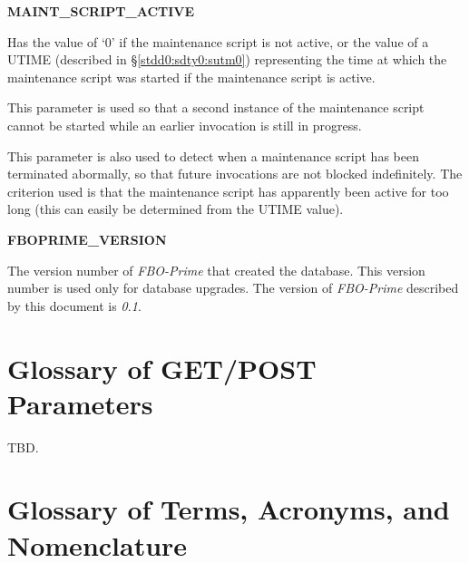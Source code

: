 \documentclass[letterpaper,10pt,titlepage]{article}
\newcommand{\productbasename}{FBO-Prime}
\newcommand{\productversion}{0.1}
\newenvironment{docglossaryenum}{\begin{list}
               {}{\setlength{\labelwidth}{0mm}
                  \setlength{\leftmargin}{4mm}
                  \setlength{\itemindent}{-4mm}
                  \setlength{\parsep}{0.85mm}}}
               {\end{list}}
\begin{document}
\begin{docglossaryenum}
\item {}\textbf{MAINT\_SCRIPT\_ACTIVE}

      Has the value of `0' if the maintenance script is not active, or 
      the value of a UTIME (described in \S{}\ref{stdd0:sdty0:sutm0}) representing
      the time at which the maintenance script was started if the
      maintenance script is active.
      
      This parameter is used 
      so that a second instance of the maintenance script cannot be started while 
      an earlier invocation is still in progress.

      This parameter is also used to detect when a maintenance script has
      been terminated abormally, so that future invocations are not
      blocked indefinitely.  The criterion used is that the maintenance
      script has apparently been active for too long (this can easily
      be determined from the UTIME value).

\item {}\textbf{FBOPRIME\_VERSION}

      The version number of \emph{\productbasename{}} that created the database.
      This version number is used only for database upgrades.
      The version of \emph{\productbasename{}} described by this document is 
      \emph{\productversion{}}.
\end{docglossaryenum}



\clearpage{}
\section{Glossary of GET/POST Parameters}
\label{sglo0}

TBD.


\clearpage{}
\section{Glossary of Terms, Acronyms, and Nomenclature}
\label{sglo1}
\end{document}
